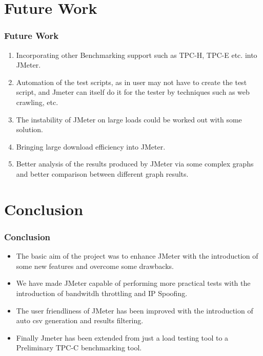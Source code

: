 \documentclass[12pt]{beamer}
\begin{document}
\section{Future Work}
\begin{frame}[c]
\frametitle{Future Work}
\begin{enumerate}
\item<+-|alert@+>  Incorporating other Benchmarking support such as TPC-H, TPC-E etc. into JMeter.
\item<+-|alert@+> Automation of the test scripts, as in user may not have to create the test script, and Jmeter can itself do it for the tester by techniques such as web crawling, etc.
\item<+-|alert@+>  The instability of JMeter on large loads could be worked out with some solution.
\item<+-|alert@+> Bringing large download efficiency into JMeter.
\item<+-|alert@+>  Better analysis of the results produced by JMeter via some complex graphs and better comparison between different graph results.
\end{enumerate}
\end{frame}

%

\section{Conclusion}
\begin{frame}[c]
 \frametitle{Conclusion}
 \begin{itemize}
  \item<+-|alert@+>The basic aim of the project was to enhance JMeter with the introduction of some new features and overcome some drawbacks.
  \item<+-|alert@+>We have made JMeter capable of performing more practical tests with the introduction of bandwitdh throttling and IP Spoofing.
  \item<+-|alert@+>The user friendliness of JMeter has been improved with the introduction of auto csv generation and results filtering.
  \item<+-|alert@+>Finally Jmeter has been extended from just a load testing tool to a Preliminary TPC-C benchmarking tool.

 \end{itemize}

\end{frame}
\end{document}
